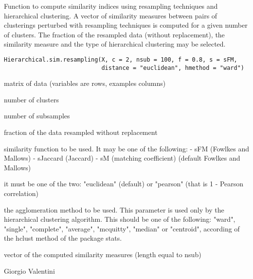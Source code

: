 \documentclass{article}
\begin{document}
\begin{Description}\relax
Function to compute similarity indices using resampling techniques and hierarchical clustering.
A vector of similarity measures between pairs of clusterings perturbed with resampling techniques is computed for a given number of clusters. 
The fraction of the resampled data (without replacement), the similarity measure and  the type of hierarchical clustering may be selected.
\end{Description}
\begin{Usage}
\begin{verbatim}
Hierarchical.sim.resampling(X, c = 2, nsub = 100, f = 0.8, s = sFM, 
                            distance = "euclidean", hmethod = "ward")
\end{verbatim}
\end{Usage}
\begin{Arguments}
\begin{ldescription}
\item[\code{X}] matrix of data (variables are rows, examples columns) 
\item[\code{c}] number of clusters 
\item[\code{nsub}] number of subsamples 
\item[\code{f}] fraction of the data resampled without replacement 
\item[\code{s}] similarity function to be used. It may be one of the following: 
- sFM (Fowlkes and Mallows)
- sJaccard (Jaccard)
- sM (matching coefficient)
(default Fowlkes and Mallows) 
\item[\code{distance}] it must be one of the two: "euclidean" (default) or "pearson" (that is 1 - Pearson correlation) 
\item[\code{hmethod}] the agglomeration method to be used. This parameter is used only by the hierarchical clustering algorithm.
This should be one of the following:
"ward", "single", "complete", "average", "mcquitty", "median" or "centroid", according of the hclust
method of the package stats. 
\end{ldescription}
\end{Arguments}
\begin{Value}
vector of the computed similarity measures (length equal to nsub)
\end{Value}
\begin{Author}\relax
Giorgio Valentini 
\end{Author}
\end{document}
